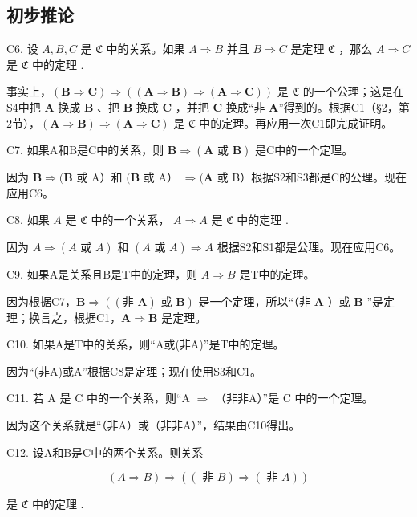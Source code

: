 \subsection{初步推论}

C6. 设 \(A, B, C\) 是 \(\mathfrak{C}\) 中的关系。如果 \(A \Longrightarrow B\) 并且 \(B \Longrightarrow C\) 是定理 \(\mathfrak{C}\) ，那么 \(A \Longrightarrow C\) 是 \(\mathfrak{C}\) 中的定理 .

事实上，\((\pmb{B} \Rightarrow \pmb{C}) \Rightarrow ((\pmb{A} \Rightarrow \pmb{B}) \Rightarrow (\pmb{A} \Rightarrow \pmb{C}))\) 是 \(\mathfrak{C}\) 的一个公理；这是在S4中把 \(\pmb{A}\) 换成 \(\pmb{B}\) 、把 \(\pmb{B}\) 换成 \(\pmb{C}\) ，并把 \(\pmb{C}\) 换成“非 \(\pmb{A}\)”得到的。根据C1（§2，第2节），\((\pmb{A} \Rightarrow \pmb{B}) \Rightarrow (\pmb{A} \Rightarrow \pmb{C})\) 是 \(\mathfrak{C}\) 中的定理。再应用一次C1即完成证明。

C7. 如果A和B是C中的关系，则 \(\mathbf{B} \Longrightarrow (\mathbf{A} \text{ 或 } \mathbf{B})\) 是C中的一个定理。

因为 \(\boldsymbol{B}\Longrightarrow(\boldsymbol{B}\) 或 A）和 \((\boldsymbol{B}\) 或 A） \(\Longrightarrow(\boldsymbol{A}\) 或 B）根据S2和S3都是C的公理。现在应用C6。

C8. 如果 \(A\) 是 \(\mathfrak{C}\) 中的一个关系， \(A \Longrightarrow A\) 是 \(\mathfrak{C}\) 中的定理 .

因为 \(A \Longrightarrow (A \text{ 或 } A)\) 和 \((A \text{ 或 } A) \Longrightarrow A\) 根据S2和S1都是公理。现在应用C6。

C9. 如果A是关系且B是T中的定理，则 \(A \Longrightarrow B\) 是T中的定理。

因为根据C7，\(\boldsymbol{B} \Rightarrow ((\text{非 } \boldsymbol{A}) \text{ 或 } \boldsymbol{B})\) 是一个定理，所以“（非 \(\boldsymbol{A}\) ）或 \(\boldsymbol{B}\) ”是定理；换言之，根据C1，\(\boldsymbol{A} \Rightarrow \boldsymbol{B}\) 是定理。

C10. 如果A是T中的关系，则“A或(非A)”是T中的定理。

因为“(非A)或A”根据C8是定理；现在使用S3和C1。

C11. 若 A 是 C 中的一个关系，则“A \(\Longrightarrow\) （非非A）”是 C 中的一个定理。

因为这个关系就是“（非A）或（非非A）”，结果由C10得出。

C12. 设A和B是C中的两个关系。则关系

\[
(A \Rightarrow B) \Rightarrow ((\text { 非 } B) \Rightarrow (\text { 非 } A))
\]

是 \(\mathfrak{C}\) 中的定理 .


